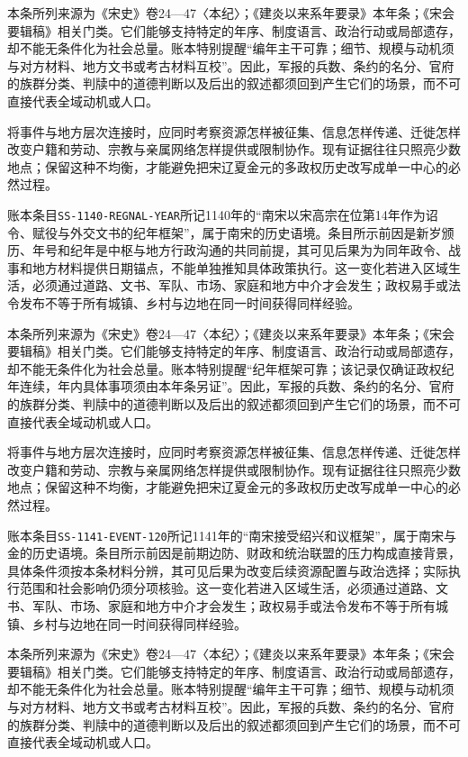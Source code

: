 本条所列来源为《宋史》卷24—47〈本纪〉；《建炎以来系年要录》本年条；《宋会要辑稿》相关门类。它们能够支持特定的年序、制度语言、政治行动或局部遗存，却不能无条件化为社会总量。账本特别提醒“编年主干可靠；细节、规模与动机须与对方材料、地方文书或考古材料互校”。因此，军报的兵数、条约的名分、官府的族群分类、判牍中的道德判断以及后出的叙述都须回到产生它们的场景，而不可直接代表全域动机或人口。

将事件与地方层次连接时，应同时考察资源怎样被征集、信息怎样传递、迁徙怎样改变户籍和劳动、宗教与亲属网络怎样提供或限制协作。现有证据往往只照亮少数地点；保留这种不均衡，才能避免把宋辽夏金元的多政权历史改写成单一中心的必然过程。

账本条目\texttt{SS-1140-REGNAL-YEAR}所记1140年的“南宋以宋高宗在位第14年作为诏令、赋役与外交文书的纪年框架”，属于南宋的历史语境。条目所示前因是新岁颁历、年号和纪年是中枢与地方行政沟通的共同前提，其可见后果为为同年政令、战事和地方材料提供日期锚点，不能单独推知具体政策执行。这一变化若进入区域生活，必须通过道路、文书、军队、市场、家庭和地方中介才会发生；政权易手或法令发布不等于所有城镇、乡村与边地在同一时间获得同样经验。

本条所列来源为《宋史》卷24—47〈本纪〉；《建炎以来系年要录》本年条；《宋会要辑稿》相关门类。它们能够支持特定的年序、制度语言、政治行动或局部遗存，却不能无条件化为社会总量。账本特别提醒“纪年框架可靠；该记录仅确证政权纪年连续，年内具体事项须由本年条另证”。因此，军报的兵数、条约的名分、官府的族群分类、判牍中的道德判断以及后出的叙述都须回到产生它们的场景，而不可直接代表全域动机或人口。

将事件与地方层次连接时，应同时考察资源怎样被征集、信息怎样传递、迁徙怎样改变户籍和劳动、宗教与亲属网络怎样提供或限制协作。现有证据往往只照亮少数地点；保留这种不均衡，才能避免把宋辽夏金元的多政权历史改写成单一中心的必然过程。

账本条目\texttt{SS-1141-EVENT-120}所记1141年的“南宋接受绍兴和议框架”，属于南宋与金的历史语境。条目所示前因是前期边防、财政和统治联盟的压力构成直接背景，具体条件须按本条材料分辨，其可见后果为改变后续资源配置与政治选择；实际执行范围和社会影响仍须分项核验。这一变化若进入区域生活，必须通过道路、文书、军队、市场、家庭和地方中介才会发生；政权易手或法令发布不等于所有城镇、乡村与边地在同一时间获得同样经验。

本条所列来源为《宋史》卷24—47〈本纪〉；《建炎以来系年要录》本年条；《宋会要辑稿》相关门类。它们能够支持特定的年序、制度语言、政治行动或局部遗存，却不能无条件化为社会总量。账本特别提醒“编年主干可靠；细节、规模与动机须与对方材料、地方文书或考古材料互校”。因此，军报的兵数、条约的名分、官府的族群分类、判牍中的道德判断以及后出的叙述都须回到产生它们的场景，而不可直接代表全域动机或人口。

